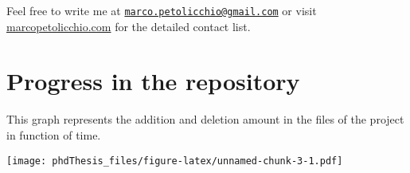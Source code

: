 \documentclass[a4paper,twoside,12pt,chapterprefix=false,bibliography=totocnumbered,listof=flat]{scrbook}
\begin{document}
Feel free to write me at
\href{mailto:marco.petolicchio@gmail.com}{\nolinkurl{marco.petolicchio@gmail.com}}
or visit \href{http://marcopetolicchio.com}{marcopetolicchio.com} for
the detailed contact list.

\section{Progress in the repository}\label{progress-in-the-repository}

This graph represents the addition and deletion amount in the files of
the project in function of time.

\texttt{[image: phdThesis\_files/figure-latex/unnamed-chunk-3-1.pdf]}


\end{document}
